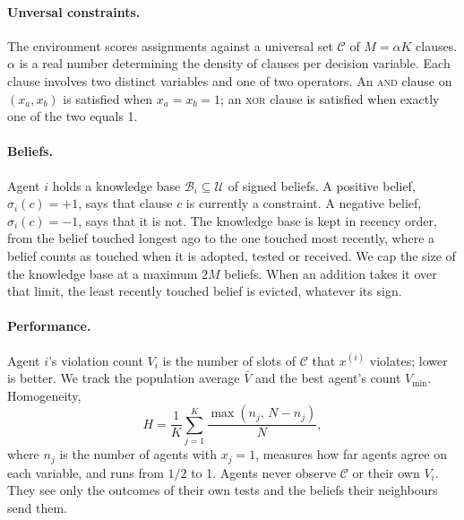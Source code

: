 \documentclass[11pt]{article}
\begin{document}
\paragraph{Unversal constraints.} The environment scores assignments against a universal set $\mathcal{C}$ of $M = \alpha K$ clauses. $\alpha$ is a real number determining the density of clauses per decision variable. Each clause involves two distinct variables and one of two operators. An \textsc{and} clause on $(x_a, x_b)$ is satisfied when $x_a = x_b = 1$; an \textsc{xor} clause is satisfied when exactly one of the two equals 1. %


\paragraph{Beliefs.} Agent $i$ holds a knowledge base $\mathcal{B}_i \subseteq \mathcal{U}$ of signed beliefs. A positive belief, $\sigma_i(c) = +1$, says that clause $c$ is currently a constraint. A negative belief, $\sigma_i(c) = -1$, says that it is not. The knowledge base is kept in recency order, from the belief touched longest ago to the one touched most recently, where a belief counts as touched when it is adopted, tested or received. We cap the size of the knowledge base at a maximum $2M$ beliefs. When an addition takes it over that limit, the least recently touched belief is evicted, whatever its sign.


\paragraph{Performance.} Agent $i$'s violation count $V_i$ is the number of slots of $\mathcal{C}$ that $x^{(i)}$ violates; lower is better. We track the population average $\bar V$ and the best agent's count $V_{\min}$. Homogeneity,
\[
H = \frac{1}{K} \sum_{j=1}^{K} \frac{\max(n_j,\, N-n_j)}{N},
\]
where $n_j$ is the number of agents with $x_j = 1$, measures how far agents agree on each variable, and runs from $1/2$ to 1. Agents never observe $\mathcal{C}$ or their own $V_i$. They see only the outcomes of their own tests and the beliefs their neighbours send them.
\end{document}
